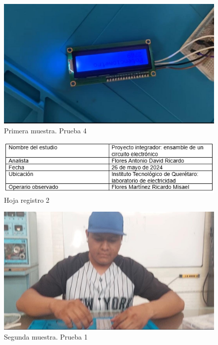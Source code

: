 \begin{figure}[H]
        \centering
        \includegraphics[trim = {0mm 0mm 0mm 0mm},clip,scale=0.2]{10/Img/muestra1Prueba4.jpg}
        \caption{Primera muestra. Prueba 4}
        \label{Prueba 4}
    \end{figure}

\begin{figure}[H]
    \centering
    \includegraphics[scale=0.4]{10/Img/hojaRegistro2.png}
    \caption{Hoja registro 2}
    \label{fig:hojaRegistro2.png}
\end{figure}

\begin{figure}[H]
        \centering
        \includegraphics[trim = {0mm 0mm 0mm 0mm},clip,scale=0.2]{10/Img/muestra2Prueba1.jpg}
        \caption{Segunda muestra. Prueba 1}
        \label{Prueba 2.1}
    \end{figure}

